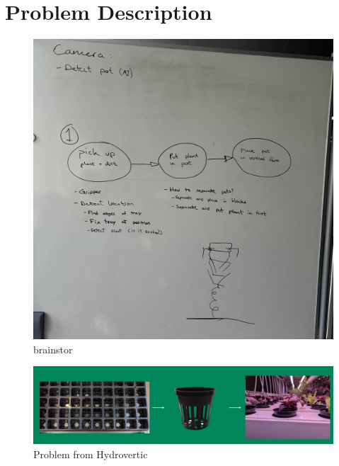 \documentclass[Setup/main.tex]{subfiles}
\begin{document}
\section{Problem Description}
\begin{figure}[H]
    \centering
    \includegraphics[width=\textwidth]{Tables and Images/brainstorm.jpg}
    \caption{brainstor}
    \label{fig:somebrainstorm}
\end{figure}

\begin{figure}[H]
    \centering
    \includegraphics[width=\textwidth]{Tables and Images/problem_hydrovertic.jpg}
    \caption{Problem from Hydrovertic}
    \label{fig:coolproblembro}
\end{figure}
\end{document}
